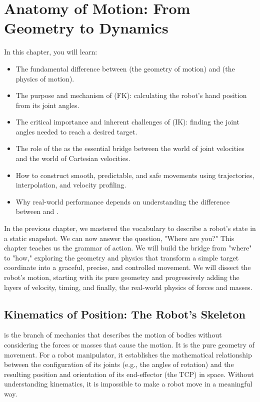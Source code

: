 \chapter{Anatomy of Motion: From Geometry to Dynamics}
\label{ch:motion_anatomy}

\begin{navigationbox}{In this chapter, you will learn:}
    \begin{itemize}
        \item The fundamental difference between  (the geometry of motion) and  (the physics of motion).
        \item The purpose and mechanism of  (FK): calculating the robot's hand position from its joint angles.
        \item The critical importance and inherent challenges of  (IK): finding the joint angles needed to reach a desired target.
        \item The role of the  as the essential bridge between the world of joint velocities and the world of Cartesian velocities.
        \item How to construct smooth, predictable, and safe movements using trajectories, interpolation, and velocity profiling.
        \item Why real-world performance depends on understanding the difference between  and .
    \end{itemize}
\end{navigationbox}

In the previous chapter, we mastered the vocabulary to describe a robot's state in a static snapshot. We can now answer the question, "Where are you?" This chapter teaches us the grammar of action. We will build the bridge from "where" to "how," exploring the geometry and physics that transform a simple target coordinate into a graceful, precise, and controlled movement. We will dissect the robot's motion, starting with its pure geometry and progressively adding the layers of velocity, timing, and finally, the real-world physics of forces and masses.

\section{Kinematics of Position: The Robot's Skeleton}
\label{sec:position_kinematics}

 is the branch of mechanics that describes the motion of bodies without considering the forces or masses that cause the motion. It is the pure geometry of movement. For a robot manipulator, it establishes the mathematical relationship between the configuration of its joints (e.g., the angles of rotation) and the resulting position and orientation of its end-effector (the TCP) in space. Without understanding kinematics, it is impossible to make a robot move in a meaningful way.

